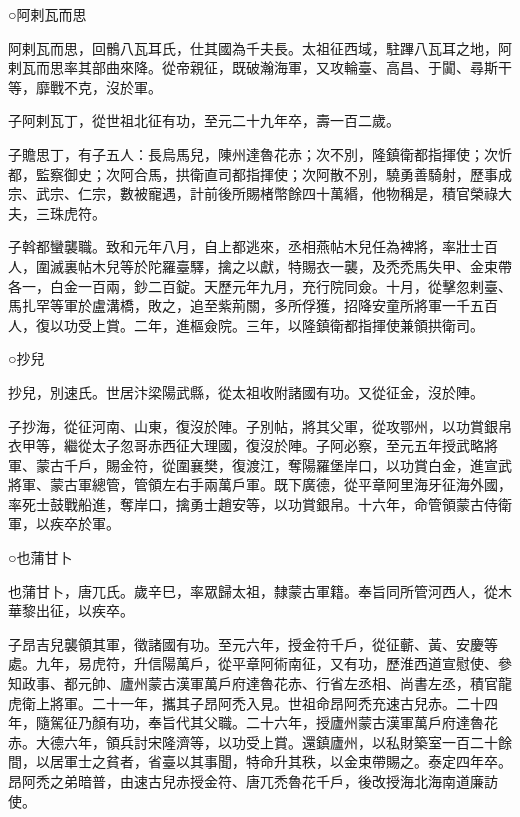 \begin{pinyinscope}
 ○阿剌瓦而思



 阿剌瓦而思，回鶻八瓦耳氏，仕其國為千夫長。太祖征西域，駐蹕八瓦耳之地，阿剌瓦而思率其部曲來降。從帝親征，既破瀚海軍，又攻輪臺、高昌、于闐、尋斯干等，靡戰不克，沒於軍。



 子阿剌瓦丁，從世祖北征有功，至元二十九年卒，壽一百二歲。



 子贍思丁，有子五人：長烏馬兒，陳州達魯花赤；次不別，隆鎮衛都指揮使；次忻都，監察御史；次阿合馬，拱衛直司都指揮使；次阿散不別，驍勇善騎射，歷事成宗、武宗、仁宗，數被寵遇，計前後所賜楮幣餘四十萬緡，他物稱是，積官榮祿大夫，三珠虎符。



 子斡都蠻襲職。致和元年八月，自上都逃來，丞相燕帖木兒任為裨將，率壯士百人，圍滅裏帖木兒等於陀羅臺驛，擒之以獻，特賜衣一襲，及禿禿馬失甲、金束帶各一，白金一百兩，鈔二百錠。天歷元年九月，充行院同僉。十月，從擊忽剌臺、馬扎罕等軍於盧溝橋，敗之，追至紫荊關，多所俘獲，招降安童所將軍一千五百人，復以功受上賞。二年，進樞僉院。三年，以隆鎮衛都指揮使兼領拱衛司。



 ○抄兒



 抄兒，別速氏。世居汴梁陽武縣，從太祖收附諸國有功。又從征金，沒於陣。



 子抄海，從征河南、山東，復沒於陣。子別帖，將其父軍，從攻鄂州，以功賞銀帛衣甲等，繼從太子忽哥赤西征大理國，復沒於陣。子阿必察，至元五年授武略將軍、蒙古千戶，賜金符，從圍襄樊，復渡江，奪陽羅堡岸口，以功賞白金，進宣武將軍、蒙古軍總管，管領左右手兩萬戶軍。既下廣德，從平章阿里海牙征海外國，率死士鼓戰船進，奪岸口，擒勇士趙安等，以功賞銀帛。十六年，命管領蒙古侍衛軍，以疾卒於軍。



 ○也蒲甘卜



 也蒲甘卜，唐兀氏。歲辛巳，率眾歸太祖，隸蒙古軍籍。奉旨同所管河西人，從木華黎出征，以疾卒。



 子昂吉兒襲領其軍，徵諸國有功。至元六年，授金符千戶，從征蘄、黃、安慶等處。九年，易虎符，升信陽萬戶，從平章阿術南征，又有功，歷淮西道宣慰使、參知政事、都元帥、廬州蒙古漢軍萬戶府達魯花赤、行省左丞相、尚書左丞，積官龍虎衛上將軍。二十一年，攜其子昂阿禿入見。世祖命昂阿禿充速古兒赤。二十四年，隨駕征乃顏有功，奉旨代其父職。二十六年，授廬州蒙古漢軍萬戶府達魯花赤。大德六年，領兵討宋隆濟等，以功受上賞。還鎮廬州，以私財築室一百二十餘間，以居軍士之貧者，省臺以其事聞，特命升其秩，以金束帶賜之。泰定四年卒。昂阿禿之弟暗普，由速古兒赤授金符、唐兀禿魯花千戶，後改授海北海南道廉訪使。




\end{pinyinscope}
